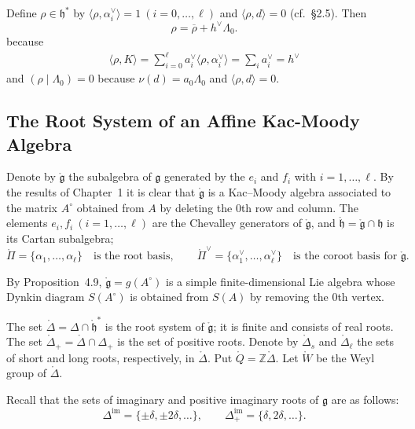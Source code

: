 \documentclass[12pt]{article}
\begin{document}
Define $\rho \in \mathfrak{h}^*$ by $\langle \rho, \alpha_i^\vee \rangle = 1 \ (i=0,\dots,\ell)$ and $\langle \rho, d \rangle = 0$ (cf.\ §2.5).  
Then 
\begin{equation}
\rho = \overline{\rho} + h^\vee \Lambda_0.
\end{equation} because \begin{align*}
    \langle \rho, K \rangle = \sum_{i=0}^\ell a_i^\vee \langle \rho, \alpha_i^\vee \rangle = \sum_i a_i^\vee = h^\vee
\end{align*} and $(\rho \mid \Lambda_0) = 0$ because $\nu(d) = a_0 \Lambda_0$ and $\langle \rho, d \rangle = 0$.
\subsection{The Root System of an Affine Kac-Moody Algebra}
Denote by $\mathring{\mathfrak{g}}$ the subalgebra of $\mathfrak{g}$ generated by the $e_i$ and $f_i$ with $i=1,\dots,\ell$. By the results of Chapter~1 it is clear that $\mathring{\mathfrak{g}}$ is a Kac--Moody algebra associated to the matrix $A^{\circ}$ obtained from $A$ by deleting the $0$th row and column. The elements $e_i,f_i \ (i=1,\dots,\ell)$ are the Chevalley generators of $\mathring{\mathfrak{g}}$, and $\mathring{\mathfrak{h}}=\mathring{\mathfrak{g}}\cap \mathfrak{h}$ is its Cartan subalgebra; 
\[
\mathring{\Pi}=\{\alpha_1,\dots,\alpha_\ell\} \quad\text{is the root basis}, \qquad
\mathring{\Pi}^\vee=\{\alpha_1^\vee,\dots,\alpha_\ell^\vee\}\quad\text{is the coroot basis for }\mathring{\mathfrak{g}}.
\]

\medskip

\noindent By Proposition~4.9, $\mathring{\mathfrak{g}}=g(A^\circ)$ is a simple finite-dimensional Lie algebra whose Dynkin diagram $S(A^\circ)$ is obtained from $S(A)$ by removing the $0$th vertex. 

The set $\mathring{\Delta}=\Delta \cap \mathring{\mathfrak{h}}^*$ is the root system of $\mathring{\mathfrak{g}}$; it is finite and consists of real roots. The set $\mathring{\Delta}_+ = \mathring{\Delta} \cap \Delta_+$ is the set of positive roots. Denote by $\mathring{\Delta}_s$ and $\mathring{\Delta}_\ell$ the sets of short and long roots, respectively, in $\mathring{\Delta}$. Put $\mathring{Q} = \mathbb{Z}\mathring{\Delta}$. Let $\mathring{W}$ be the Weyl group of $\mathring{\Delta}$.

Recall that the sets of imaginary and positive imaginary roots of $\mathfrak{g}$ are as follows:
\[
\Delta^{\mathrm{im}} = \{\pm \delta, \pm 2\delta, \dots \}, 
\qquad 
\Delta^{\mathrm{im}}_+ = \{\delta, 2\delta, \dots\}.
\]
\end{document}
